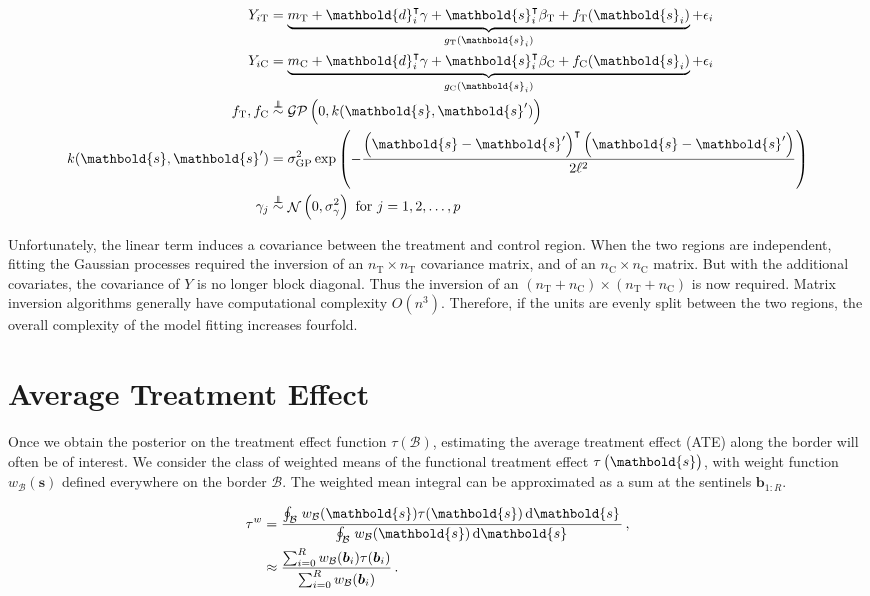 \documentclass[letter]{article}
\DeclareMathOperator{\normal}{\mathcal{N}}
\newcommand{\gp}{\mathcal{GP}}
\newcommand{\trans}{^{\intercal}}
\newcommand{\treat}{\mathrm{T}}
\newcommand{\ctrol}{\mathrm{C}}
\newcommand{\sigmaf}{\sigma_{\mathrm{GP}}}
\newcommand{\sigmagamma}{\sigma_{\gamma}}
\newcommand{\svec}{\mathbold{s}}
\newcommand{\dvec}{\mathbold{d}}
\newcommand{\indep}{\protect\mathpalette{\protect\independenT}{\perp}}
\def\independenT#1#2{\mathrel{\rlap{$#1#2$}\mkern2mu{#1#2}}}
\newcommand{\border}{\mathcal{B}}
\newcommand{\sentinels}{\bm{b}}
\newcommand{\tauw}{\tau^{w}}
\newcommand{\eqlabel}[1]{\label{#1}}
\newcommand{\numsent}{R}
\newcommand{\weightb}{w_{\border}}
\begin{document}
\begin{equation}
\begin{split}
Y_{i\treat} &= \underbrace{m_\treat{} + \dvec_i\trans \gamma + \svec_i\trans\beta_\treat{} + f_\treat{}(\svec_i)}_{g_\treat{}(\svec_i)} + \epsilon_i \\
Y_{i\ctrol} &= \underbrace{m_\ctrol{} + \dvec_i\trans \gamma + \svec_i\trans\beta_\ctrol{} + f_\ctrol{}(\svec_i)}_{g_\ctrol{}(\svec_i)} + \epsilon_i \\
f_\treat{}, f_\ctrol{} &\overset{\indep}{\sim} \gp\del{0, k(\svec, \svec')} \\
k(\svec,\svec') &= \sigmaf^2 \exp\del{ - \frac{\del{\svec-\svec'}\trans\del{\svec-\svec'}}{2 \ell^2}} \\
\gamma_j &\overset{\indep}{\sim} \normal\del{0,\sigmagamma^2}\text{ for }j=1,2,\ldots,p
\end{split}
\end{equation}

Unfortunately, the linear term induces a covariance between the treatment and control region.
When the two regions are independent, fitting the Gaussian processes required the inversion of an \(n_\treat{} \times n_\treat{}\) covariance matrix, and of an \(n_\ctrol{} \times n_\ctrol{}\) matrix.
But with the additional covariates, the covariance of \(Y\) is no longer block diagonal.
Thus the inversion of an \((n_\treat{}+n_\ctrol{}) \times (n_\treat{}+n_\ctrol{})\) is now required.
Matrix inversion algorithms generally have computational complexity \(O(n^3)\).
Therefore, if the units are evenly split between the two regions,
the overall complexity of the model fitting increases fourfold.
    


    	\section{Average Treatment Effect}\label{average-treatment-effect}
    

\label{sec:ate}
    	Once we obtain the posterior on the treatment effect function \(\tau(\border)\), estimating the average treatment effect (ATE) along the border will often be of interest.
We consider the class of weighted means of the functional treatment effect \(\tau\del{\svec}\),
with weight function \(\weightb(\svec)\) defined everywhere on the border \(\border\).
The weighted mean integral can be approximated as a sum at the sentinels \(\sentinels_{1:\numsent}\).

\begin{equation}\begin{split}
    \tauw &= \frac{\oint_\border \left. \weightb(\svec) \tau(\svec) \dif \svec \right.}
                  {\oint_\border \left. \weightb(\svec) \dif \svec \right.}\,,\\
          &\approx \frac{\sum_{i=0}^\numsent \weightb(\sentinels_i) \tau(\sentinels_i)}
                       {\sum_{i=0}^\numsent \weightb(\sentinels_i) } \,.
\end{split}
\eqlabel{eq:weighted_estimand}
\end{equation}
\end{document}
